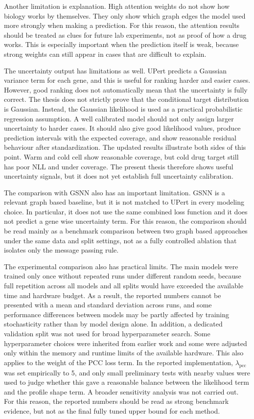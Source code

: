 \noindent Another limitation is explanation. High attention weights do not show how biology works by themselves. They only show which graph edges the model used more strongly when making a prediction. For this reason, the attention results should be treated as clues for future lab experiments, not as proof of how a drug works. This is especially important when the prediction itself is weak, because strong weights can still appear in cases that are difficult to explain.

\noindent The uncertainty output has limitations as well. UPert predicts a Gaussian variance term for each gene, and this is useful for ranking harder and easier cases. However, good ranking does not automatically mean that the uncertainty is fully correct. The thesis does not strictly prove that the conditional target distribution is Gaussian. Instead, the Gaussian likelihood is used as a practical probabilistic regression assumption. A well calibrated model should not only assign larger uncertainty to harder cases. It should also give good likelihood values, produce prediction intervals with the expected coverage, and show reasonable residual behaviour after standardization. The updated results illustrate both sides of this point. Warm and cold cell show reasonable coverage, but cold drug target still has poor NLL and under coverage. The present thesis therefore shows useful uncertainty signals, but it does not yet establish full uncertainty calibration.

\noindent The comparison with GSNN also has an important limitation. GSNN is a relevant graph based baseline, but it is not matched to UPert in every modeling choice. In particular, it does not use the same combined loss function and it does not predict a gene wise uncertainty term. For this reason, the comparison should be read mainly as a benchmark comparison between two graph based approaches under the same data and split settings, not as a fully controlled ablation that isolates only the message passing rule.

\noindent The experimental comparison also has practical limits. The main models were trained only once without repeated runs under different random seeds, because full repetition across all models and all splits would have exceeded the available time and hardware budget. As a result, the reported numbers cannot be presented with a mean and standard deviation across runs, and some performance differences between models may be partly affected by training stochasticity rather than by model design alone. In addition, a dedicated validation split was not used for broad hyperparameter search. Some hyperparameter choices were inherited from earlier work and some were adjusted only within the memory and runtime limits of the available hardware. This also applies to the weight of the PCC loss term. In the reported implementation, $\lambda_{\mathrm{pcc}}$ was set empirically to 5, and only small preliminary tests with nearby values were used to judge whether this gave a reasonable balance between the likelihood term and the profile shape term. A broader sensitivity analysis was not carried out. For this reason, the reported numbers should be read as strong benchmark evidence, but not as the final fully tuned upper bound for each method.

